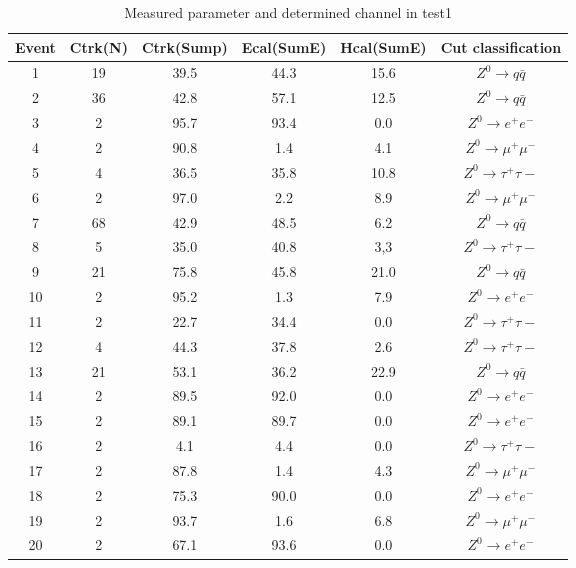 \begin{table*}[htbp]
	\centering
	
	\begin{tabular}{ccc ccc}
		\toprule
		Event & Ctrk(N) & Ctrk(Sump) & Ecal(SumE) & Hcal(SumE) & Cut classification \\
		\midrule

1& 19& 39.5&44.3&15.6 & $ {Z}^0\rightarrow q\bar{q}$\\
2& 36& 42.8&57.1&12.5& $ {Z}^0\rightarrow q \bar{q}$\\
3& 2& 95.7& 93.4&0.0& $ {Z}^0\rightarrow e^+e^- $\\
4& 2& 90.8&1.4&4.1& $ {Z}^0\rightarrow \mu^+\mu^- $\\
5& 4& 36.5&35.8&10.8& $ {Z}^0\rightarrow \tau^+\tau-$\\
6& 2& 97.0&2.2&8.9& $ {Z}^0\rightarrow \mu^+\mu^- $\\
7& 68& 42.9&48.5&6.2& $ {Z}^0\rightarrow q\bar{q}$\\
8& 5& 35.0&40.8&3,3& $ {Z}^0\rightarrow \tau^+\tau-$\\
9& 21& 75.8&45.8&21.0&$ {Z}^0\rightarrow q \bar{q}$\\
10& 2& 95.2&1.3&7.9& $ {Z}^0\rightarrow e^+e^- $\\
11& 2& 22.7&34.4&0.0& $ {Z}^0\rightarrow \tau^+\tau-$\\
12& 4& 44.3&37.8&2.6& $ {Z}^0\rightarrow \tau^+\tau-$\\
13& 21& 53.1&36.2&22.9& $ {Z}^0\rightarrow q\bar{q}$\\
14& 2& 89.5&92.0&0.0& $ {Z}^0\rightarrow e^+e^- $\\
15& 2& 89.1&89.7&0.0& $ {Z}^0\rightarrow e^+e^- $\\
16& 2& 4.1&4.4&0.0& $ {Z}^0\rightarrow \tau^+\tau-$\\
17& 2& 87.8&1.4&4.3& $ {Z}^0\rightarrow \mu^+\mu^- $\\
18& 2& 75.3&90.0&0.0& $ {Z}^0\rightarrow e^+e^- $\\
19& 2& 93.7&1.6&6.8& $ {Z}^0\rightarrow \mu^+\mu^- $\\
20& 2& 67.1&93.6&0.0& $ {Z}^0\rightarrow e^+e^- $\\
\bottomrule
\end{tabular}
\caption{Measured parameter and determined channel in test1}
\label{tab:test1}
\end{table*}
